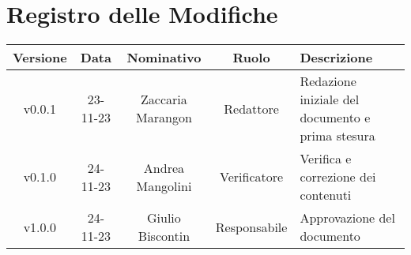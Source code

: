 \section*{\Large Registro delle Modifiche}
    \begin{table}[h]
        \centering
        \renewcommand\tabularxcolumn[1]{m{#1}} %
        \renewcommand{\arraystretch}{1.5}
        \begin{tabularx}{0.98\textwidth}
            {c|c|c|c|>{\centering\arraybackslash}X}
            \rowcolor{black}
            \textbf{\color{white} Versione} & \textbf{\color{white} Data} & \textbf{\color{white} Nominativo} & \textbf{\color{white} Ruolo} & \textbf{\color{white} Descrizione} \\ 
            \hline

            v0.0.1 & 23-11-23 & Zaccaria Marangon & Redattore & Redazione iniziale del documento e prima stesura \\
            v0.1.0 & 24-11-23 & Andrea Mangolini & Verificatore & Verifica e correzione dei contenuti \\
            v1.0.0 & 24-11-23 & Giulio Biscontin & Responsabile & Approvazione del documento \\
            \hline
        \end{tabularx}
    \end{table}
